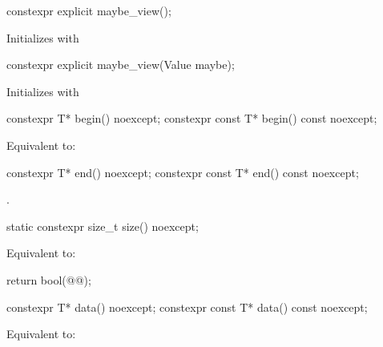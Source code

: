 \documentclass[a4paper,10pt,oneside,openany,final,article]{memoir}
\begin{document}
\begin{wording}
\begin{codeblock}
\end{codeblock}

\begin{itemdecl}
  constexpr explicit maybe_view();
\end{itemdecl}
\begin{itemdescr}
  \pnum{}
  \effects{}
  Initializes  with 
\end{itemdescr}

\begin{itemdecl}
  constexpr explicit maybe_view(Value maybe);
\end{itemdecl}
\begin{itemdescr}
  \pnum{}
  \effects{}
  Initializes  with 
\end{itemdescr}

\begin{itemdecl}
  constexpr T* begin() noexcept;
  constexpr const T* begin() const noexcept;
\end{itemdecl}

\begin{itemdescr}
  \pnum
  \effects
  Equivalent to: 
\end{itemdescr}

\begin{itemdecl}
  constexpr T* end() noexcept;
  constexpr const T* end() const noexcept;
\end{itemdecl}

\begin{itemdescr}
  \pnum{}
  \returns {}.
\end{itemdescr}

\begin{itemdecl}
  static constexpr size_t size() noexcept;
\end{itemdecl}

\begin{itemdescr}
  \pnum{}
  \effects{}
  Equivalent to:

  \begin{codeblock}
    return bool(@@);
  \end{codeblock}
\end{itemdescr}

\begin{itemdecl}
  constexpr T* data() noexcept;
  constexpr const T* data() const noexcept;
\end{itemdecl}

\begin{itemdescr}
  \pnum{}
  \effects{}
  Equivalent to:


\end{itemdescr}
\end{wording}
\end{document}
